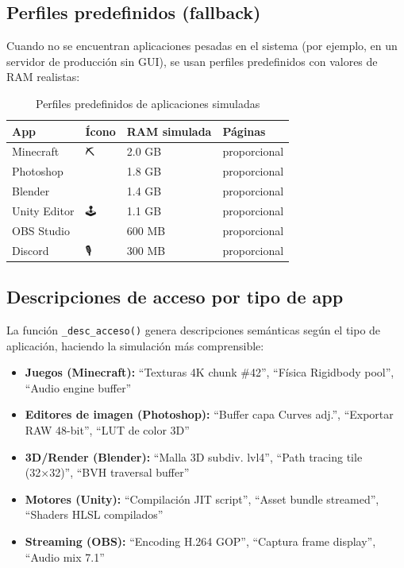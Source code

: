 \documentclass[12pt,a4paper]{article}
\begin{document}
\subsection{Perfiles predefinidos (fallback)}

Cuando no se encuentran aplicaciones pesadas en el sistema (por ejemplo, en un servidor
de producción sin GUI), se usan perfiles predefinidos con valores de RAM realistas:

\begin{table}[H]
\centering
\begin{tabular}{llll}
\toprule
\textbf{App} & \textbf{Ícono} & \textbf{RAM simulada} & \textbf{Páginas} \\
\midrule
Minecraft     & ⛏️  & 2.0 GB & proporcional \\
Photoshop     & 🎨  & 1.8 GB & proporcional \\
Blender       & 🔶  & 1.4 GB & proporcional \\
Unity Editor  & 🕹️  & 1.1 GB & proporcional \\
OBS Studio    & 🎥  & 600 MB & proporcional \\
Discord       & 🎙️  & 300 MB & proporcional \\
\bottomrule
\end{tabular}
\caption{Perfiles predefinidos de aplicaciones simuladas}
\end{table}

\subsection{Descripciones de acceso por tipo de app}

La función \texttt{\_desc\_acceso()} genera descripciones semánticas según el tipo de
aplicación, haciendo la simulación más comprensible:

\begin{itemize}[leftmargin=1.5cm]
  \item \textbf{Juegos (Minecraft):} ``Texturas 4K chunk \#42'', ``Física Rigidbody pool'', ``Audio engine buffer''
  \item \textbf{Editores de imagen (Photoshop):} ``Buffer capa Curves adj.'', ``Exportar RAW 48-bit'', ``LUT de color 3D''
  \item \textbf{3D/Render (Blender):} ``Malla 3D subdiv. lvl4'', ``Path tracing tile (32×32)'', ``BVH traversal buffer''
  \item \textbf{Motores (Unity):} ``Compilación JIT script'', ``Asset bundle streamed'', ``Shaders HLSL compilados''
  \item \textbf{Streaming (OBS):} ``Encoding H.264 GOP'', ``Captura frame display'', ``Audio mix 7.1''
\end{itemize}
\end{document}
